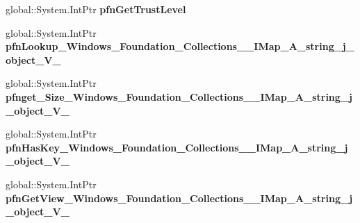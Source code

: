 \begin{DoxyCompactItemize}
global\+::\+System.\+Int\+Ptr {\bfseries pfn\+Get\+Trust\+Level}
\item 
\mbox{\label{struct_system_1_1_collections_1_1_generic_1_1_i_dictionary___a__string__j___system___object___v_______impl_1_1_vtbl_ac8e5ffd92b9518e73c06de3b006d850b}} 
global\+::\+System.\+Int\+Ptr {\bfseries pfn\+Lookup\+\_\+\+Windows\+\_\+\+Foundation\+\_\+\+Collections\+\_\+\+\_\+\+I\+Map\+\_\+\+A\+\_\+string\+\_\+j\+\_\+object\+\_\+\+V\+\_\+}
\item 
\mbox{\label{struct_system_1_1_collections_1_1_generic_1_1_i_dictionary___a__string__j___system___object___v_______impl_1_1_vtbl_a27585793a63371db6ad91f8b82c07464}} 
global\+::\+System.\+Int\+Ptr {\bfseries pfnget\+\_\+\+Size\+\_\+\+Windows\+\_\+\+Foundation\+\_\+\+Collections\+\_\+\+\_\+\+I\+Map\+\_\+\+A\+\_\+string\+\_\+j\+\_\+object\+\_\+\+V\+\_\+}
\item 
\mbox{\label{struct_system_1_1_collections_1_1_generic_1_1_i_dictionary___a__string__j___system___object___v_______impl_1_1_vtbl_a3065dbd6ab05be11bc075322c08eaec4}} 
global\+::\+System.\+Int\+Ptr {\bfseries pfn\+Has\+Key\+\_\+\+Windows\+\_\+\+Foundation\+\_\+\+Collections\+\_\+\+\_\+\+I\+Map\+\_\+\+A\+\_\+string\+\_\+j\+\_\+object\+\_\+\+V\+\_\+}
\item 
\mbox{\label{struct_system_1_1_collections_1_1_generic_1_1_i_dictionary___a__string__j___system___object___v_______impl_1_1_vtbl_ae615f25dcea093c9e464cc5727e80748}} 
global\+::\+System.\+Int\+Ptr {\bfseries pfn\+Get\+View\+\_\+\+Windows\+\_\+\+Foundation\+\_\+\+Collections\+\_\+\+\_\+\+I\+Map\+\_\+\+A\+\_\+string\+\_\+j\+\_\+object\+\_\+\+V\+\_\+}
\item 
\mbox{\label{struct_system_1_1_collections_1_1_generic_1_1_i_dictionary___a__string__j___system___object___v_______impl_1_1_vtbl_a1b89d092c18a89ddc123ce0f3cae27cd}} 

\end{DoxyCompactItemize}
